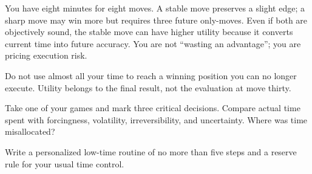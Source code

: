 \begin{workedbox}[title={Worked example: buying future accuracy}]
You have eight minutes for eight moves. A stable move preserves a slight edge; a sharp move may win more but requires three future only-moves. Even if both are objectively sound, the stable move can have higher utility because it converts current time into future accuracy. You are not ``wasting an advantage''; you are pricing execution risk.
\end{workedbox}

\begin{warningbox}
Do not use almost all your time to reach a winning position you can no longer execute. Utility belongs to the final result, not the evaluation at move thirty.
\end{warningbox}

\begin{exercise}
Take one of your games and mark three critical decisions. Compare actual time spent with forcingness, volatility, irreversibility, and uncertainty. Where was time misallocated?
\end{exercise}

\begin{exercise}
Write a personalized low-time routine of no more than five steps and a reserve rule for your usual time control.
\end{exercise}

